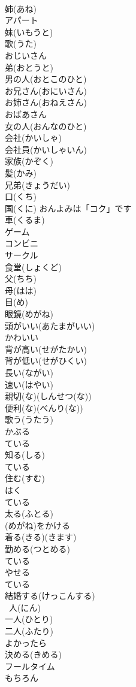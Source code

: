 \documentclass[8pt]{extreport}
\begin{document}
\begin{CJK}{UTF8}{min}
\\	姉(あね)
\\	アパート
\\	妹(いもうと)
\\	歌(うた)
\\	おじいさん
\\	弟(おとうと)
\\	男の人(おとこのひと)
\\	お兄さん(おにいさん)
\\	お姉さん(おねえさん)
\\	おばあさん
\\	女の人(おんなのひと)
\\	会社(かいしゃ)
\\	会社員(かいしゃいん)
\\	家族(かぞく)
\\	髪(かみ)
\\	兄弟(きょうだい)
\\	口(くち)
\\	国(くに) おんよみは「コク」です
\\	車(くるま)
\\	ゲーム
\\	コンビニ
\\	サークル
\\	食堂(しょくど)
\\	父(ちち)
\\	母(はは)
\\	目(め)
\\	眼鏡(めがね)
\\	頭がいい(あたまがいい)
\\	かわいい
\\	背が高い(せがたかい)
\\	背が低い(せがひくい)
\\	長い(ながい)
\\	速い(はやい)
\\	親切(な)(しんせつ(な))
\\	便利(な)(べんり(な))
\\	歌う(うたう)
\\	かぶる
\\	ている 
\\	知る(しる)
\\	ている 
\\	住む(すむ)
\\	はく
\\	ている 
\\	太る(ふとる)
\\	(めがね)をかける
\\	着る(きる)(きます)
\\	勤める(つとめる)
\\	ている 
\\	やせる
\\	ている 
\\	結婚する(けっこんする)
\\	~人(にん)
\\	一人(ひとり)
\\	二人(ふたり)
\\	よかったら
\\	決める(きめる)
\\	フールタイム
\\	もちろん
\end{CJK}
\end{document}
